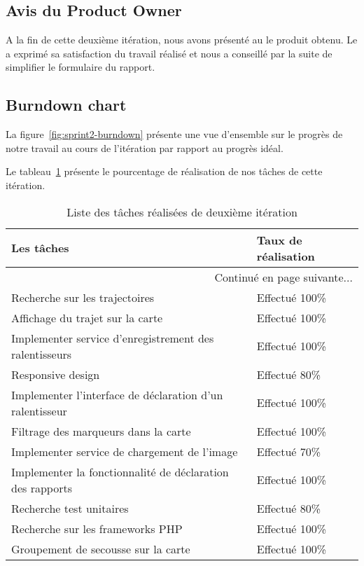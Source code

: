 \subsection{Avis du Product Owner}

A la fin de cette deuxième itération, nous avons présenté au  le produit obtenu. Le  a exprimé sa
satisfaction du travail réalisé et nous a conseillé par la suite de simplifier
le formulaire du rapport.

\subsection{Burndown chart}

La figure~\ref{fig:sprint2-burndown} présente une vue d'ensemble sur le progrès
de notre travail au cours de l'itération par rapport au progrès idéal.



Le tableau~\ref{tab:sprint2-evaluation} présente le pourcentage de
réalisation de nos tâches de cette itération.
\begin{center}
    \begin{longtable}{| l | l |}
        \caption{Liste des tâches réalisées de deuxième itération}
\label{tab:sprint2-evaluation} \\

        \hline
        \textbf{Les tâches} & \textbf{Taux de réalisation} \\ \hline
        \endhead

        \hline \multicolumn{2}{|r|}{{Continué en page suivante$\dotsc$}} \\ \hline
        \endfoot

        \hline \hline
        \endlastfoot

        \hline
Recherche sur les trajectoires & Effectué 100\% \\ \hline
Affichage du trajet sur la carte & Effectué 100\% \\ \hline
Implementer service d'enregistrement des ralentisseurs & Effectué 100\% \\ \hline
Responsive design & Effectué 80\% \\ \hline
Implementer l'interface de déclaration d'un ralentisseur & Effectué 100\% \\ \hline
Filtrage des marqueurs dans la carte & Effectué 100\% \\ \hline
Implementer service de chargement de l'image & Effectué 70\% \\ \hline
Implementer la fonctionnalité de déclaration des rapports & Effectué 100\% \\ \hline
Recherche test unitaires & Effectué 80\% \\ \hline
Recherche sur les frameworks PHP & Effectué 100\% \\ \hline
Groupement de secousse sur la carte & Effectué 100\% \\ \hline
    \end{longtable}
\end{center}

